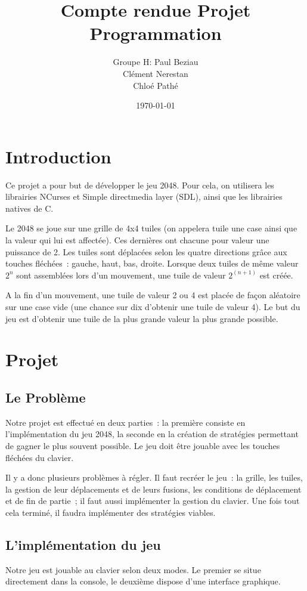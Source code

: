 \documentclass[12pt]{report}
\title{Compte rendue Projet Programmation}
\author{Groupe H:
 Paul Beziau\\
 Clément Nerestan\\
 Chloé Pathé\\
 }
\date{\today}
\begin{document}
\maketitle

\tableofcontents

\chapter{Introduction}
Ce projet a pour but de développer le jeu 2048. Pour cela, on utilisera les librairies NCurses et Simple directmedia layer (SDL), ainsi que les librairies natives de C.

Le 2048 se joue sur une grille de 4x4 tuiles (on appelera tuile une case ainsi que la valeur qui lui est affectée). Ces dernières ont chacune pour valeur une puissance de 2. Les tuiles sont déplacées selon les quatre directions grâce aux touches fléchées : gauche, haut, bas, droite. Lorsque deux tuiles de même valeur $2^n$ sont assemblées lors d’un mouvement, une tuile de valeur $2^{(n+1)}$ est créée.

A la fin d’un mouvement, une tuile de valeur 2 ou 4 est placée de façon aléatoire sur une case vide (une chance sur dix d’obtenir une tuile de valeur 4).
Le but du jeu est d’obtenir une tuile de la plus grande valeur la plus grande possible.

\chapter{Projet}
\section{Le Problème}
Notre projet est effectué en deux parties : la première consiste en l’implémentation du jeu 2048, la seconde en la création de stratégies permettant de gagner le plus souvent possible. Le jeu doit être jouable avec les touches fléchées du clavier.

Il y a donc plusieurs problèmes à régler. Il faut recréer le jeu : la grille, les tuiles, la gestion de leur déplacements et de leurs fusions, les conditions de déplacement et de fin de partie ; il faut aussi implémenter la gestion du clavier. Une fois tout cela terminé, il faudra implémenter des stratégies viables.

\section{L’implémentation du jeu}
Notre jeu est jouable au clavier selon deux modes. Le premier se situe directement dans la console, le deuxième dispose d’une interface graphique. 
\end{document}
